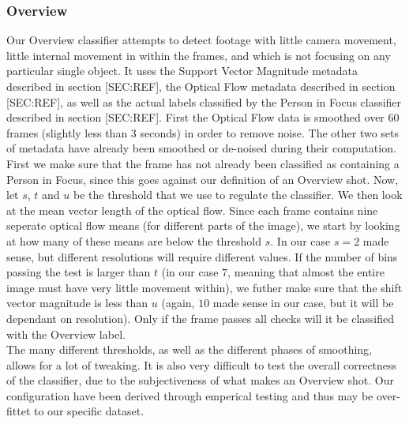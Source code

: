 \subsubsection{Overview}
%
Our Overview classifier attempts to detect footage with little camera movement, little internal movement in within the frames, and which is not focusing on any particular single object. It uses the Support Vector Magnitude metadata described in section [SEC:REF], the Optical Flow metadata described in section [SEC:REF], as well as the actual labels classified by the Person in Focus classifier described in section [SEC:REF]. First the Optical Flow data is smoothed over 60 frames (slightly less than 3 seconds) in order to remove noise. The other two sets of metadata have already been smoothed or de-noised during their computation.\\
First we make sure that the frame has not already been classified as containing a Person in Focus, since this goes against our definition of an Overview shot. Now, let $s$, $t$ and $u$ be the threshold that we use to regulate the classifier. We then look at the mean vector length of the optical flow. Since each frame contains nine seperate optical flow means (for different parts of the image), we start by looking at how many of these means are below the threshold $s$. In our case $s=2$ made sense, but different resolutions will require different values. If the number of bins passing the test is larger than $t$ (in our case $7$, meaning that almost the entire image must have very little movement within), we futher make sure that the shift vector magnitude is less than $u$ (again, $10$ made sense in our case, but it will be dependant on resolution). Only if the frame passes all checks will it be classified with the Overview label.\\
The many different thresholds, as well as the different phases of smoothing, allows for a lot of tweaking. It is also very difficult to test the overall correctness of the classifier, due to the subjectiveness of what makes an Overview shot. Our configuration have been derived through emperical testing and thus may be over-fittet to our specific dataset.
%
